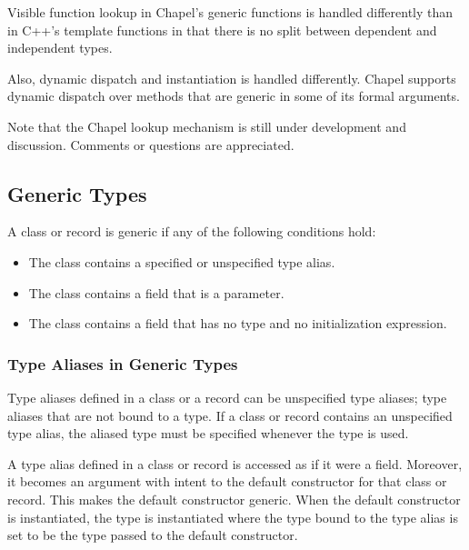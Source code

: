 \begin{rationale}
Visible function lookup in Chapel's generic functions is handled
differently than in C++'s template functions in that there is no split
between dependent and independent types.

Also, dynamic dispatch and instantiation is handled differently.
Chapel supports dynamic dispatch over methods that are generic in some
of its formal arguments.

Note that the Chapel lookup mechanism is still under development and
discussion.  Comments or questions are appreciated.
\end{rationale}

\subsection{Generic Types}
\label{Generic_Types}

A class or record is generic if any of the following conditions hold:
\begin{itemize}
\item
The class contains a specified or unspecified type alias.
\item
The class contains a field that is a parameter.
\item
The class contains a field that has no type and no initialization
expression.
\end{itemize}

\subsubsection{Type Aliases in Generic Types}
\label{Type_Aliases_in_Generic_Types}

Type aliases defined in a class or a record can be unspecified type
aliases; type aliases that are not bound to a type.  If a class or
record contains an unspecified type alias, the aliased type must be
specified whenever the type is used.

A type alias defined in a class or record is accessed as if it were a
field.  Moreover, it becomes an argument with intent  to
the default constructor for that class or record.  This makes the
default constructor generic.  When the default constructor is
instantiated, the type is instantiated where the type bound to the
type alias is set to be the type passed to the default constructor.

